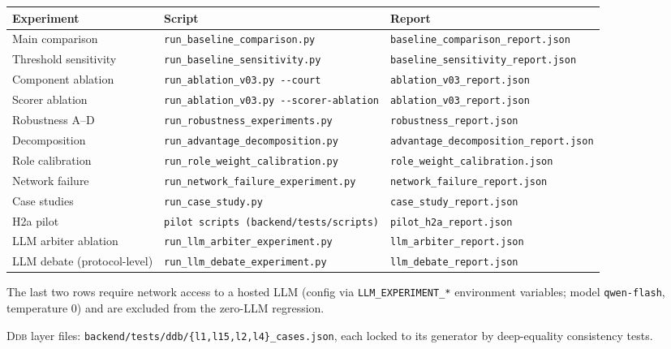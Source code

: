\documentclass[11pt]{article}
\newcommand{\Ddb}{\textsc{Ddb}}
\begin{document}
\begin{table}[h]
\centering
\setlength{\tabcolsep}{3pt}
\scriptsize
\begin{tabular}{@{}lll@{}}
\toprule
Experiment & Script & Report \\
\midrule
Main comparison & \texttt{run\_baseline\_comparison.py} & \texttt{baseline\_comparison\_report.json} \\
Threshold sensitivity & \texttt{run\_baseline\_sensitivity.py} & \texttt{baseline\_sensitivity\_report.json} \\
Component ablation & \texttt{run\_ablation\_v03.py -{}-court} & \texttt{ablation\_v03\_report.json} \\
Scorer ablation & \texttt{run\_ablation\_v03.py -{}-scorer-ablation} & \texttt{ablation\_v03\_report.json} \\
Robustness A--D & \texttt{run\_robustness\_experiments.py} & \texttt{robustness\_report.json} \\
Decomposition & \texttt{run\_advantage\_decomposition.py} &
\texttt{advantage\_decomposition\_report.json} \\
Role calibration & \texttt{run\_role\_weight\_calibration.py} & \texttt{role\_weight\_calibration.json} \\
Network failure & \texttt{run\_network\_failure\_experiment.py} & \texttt{network\_failure\_report.json} \\
Case studies & \texttt{run\_case\_study.py} & \texttt{case\_study\_report.json} \\
H2a pilot & \texttt{pilot scripts (backend/tests/scripts)} & \texttt{pilot\_h2a\_report.json} \\
LLM arbiter ablation & \texttt{run\_llm\_arbiter\_experiment.py} & \texttt{llm\_arbiter\_report.json} \\
LLM debate (protocol-level) & \texttt{run\_llm\_debate\_experiment.py} & \texttt{llm\_debate\_report.json} \\
\bottomrule
\end{tabular}
\end{table}

The last two rows require network access to a hosted LLM (config via
\texttt{LLM\_EXPERIMENT\_*} environment variables; model \texttt{qwen-flash},
temperature 0) and are excluded from the zero-LLM regression.

\Ddb{} layer files: \texttt{backend/tests/ddb/\{l1,l15,l2,l4\}\_cases.json}, each
locked to its generator by deep-equality consistency tests.
\end{document}
